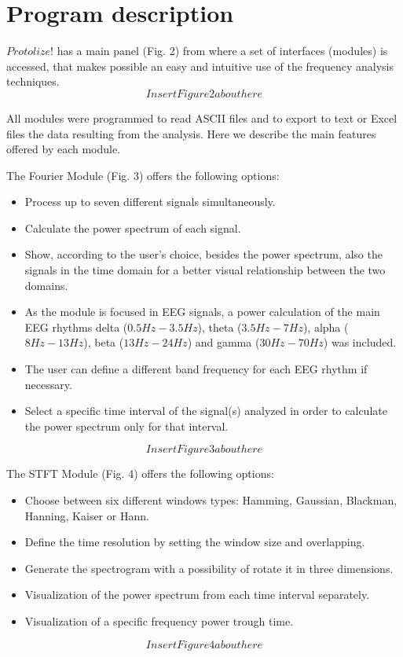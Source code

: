 \documentclass[12pt, a4paper]{article}
\begin{document}
%


\section{Program description}

$Protolize!$ has a main panel (Fig. 2) from where a set of interfaces (modules) is accessed, that makes possible an easy and intuitive use of the frequency analysis techniques. 
$$Insert Figure 2 about here$$

All modules were programmed to read ASCII files and to export to text or Excel files the data resulting from the analysis. Here we describe the main features offered by each module. 

The Fourier Module (Fig. 3) offers the following options:
\begin{itemize}
\item Process up to seven different signals simultaneously.
\item Calculate the power spectrum of each signal. 
\item Show, according to the user’s choice, besides the power spectrum, also the signals in the time domain for a better visual relationship between the two domains. 
\item As the module is focused in EEG signals, a power calculation of the main EEG rhythms delta ($0.5Hz-3.5Hz$), theta ($3.5Hz-7Hz$), alpha ($8Hz-13Hz$), beta ($13Hz-24Hz$) and gamma ($30Hz-70Hz$) was included.
\item The user can define a different band frequency for each EEG rhythm if necessary.
\item Select a specific time interval of the signal(s) analyzed in order to calculate the power spectrum only for that interval.
\end{itemize}
$$Insert Figure 3 about here$$

The STFT Module (Fig. 4) offers the following options:
\begin{itemize}
\item Choose between six different windows types: Hamming, Gaussian, Blackman, Hanning, Kaiser or Hann.
\item Define the time resolution by setting the window size and overlapping. 
\item Generate the spectrogram with a possibility of rotate it in three dimensions. 
\item Visualization of the power spectrum from each time interval separately.
\item Visualization of a specific frequency power trough time.
\end{itemize}
$$Insert Figure 4 about here$$
\end{document}

